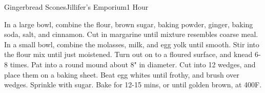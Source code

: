 \begin{recipe}{Gingerbread Scones}{Jillifer's Emporium}{1 Hour}

  In a large bowl, combine the flour, brown sugar, baking powder,
  ginger, baking soda, salt, and cinnamon. Cut in margarine until
  mixture resembles coarse meal. In a small bowl, combine the
  molasses, milk, and egg yolk until smooth. Stir into the flour mix
  until just moistened. Turn out on to a floured surface, and knead
  6-8 times. Pat into a round mound about 8" in diameter. Cut into 12
  wedges, and place them on a baking sheet. Beat egg whites until
  frothy, and brush over wedges. Sprinkle with sugar. Bake for 12-15
  mins, or until golden brown, at 400\0F.
\end{recipe}
